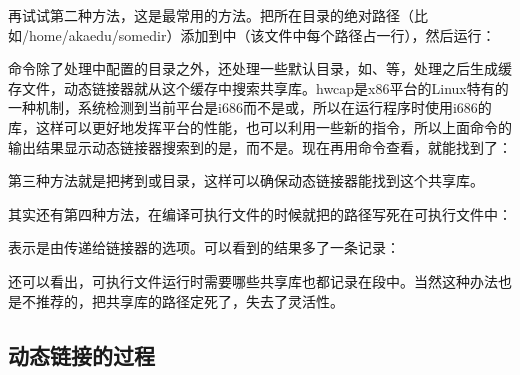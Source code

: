 再试试第二种方法，这是最常用的方法。把所在目录的绝对路径（比如/home/\BookSplit{}akaedu/\BookSplit{}somedir）添加到中（该文件中每个路径占一行），然后运行：




命令除了处理中配置的目录之外，还处理一些默认目录，如、等，处理之后生成缓存文件，动态链接器就从这个缓存中搜索共享库。hwcap是x86平台的Linux特有的一种机制，系统检测到当前平台是i686而不是或，所以在运行程序时使用i686的库，这样可以更好地发挥平台的性能，也可以利用一些新的指令，所以上面命令的输出结果显示动态链接器搜索到的是，而不是。现在再用命令查看，就能找到了：




第三种方法就是把拷到或目录，这样可以确保动态链接器能找到这个共享库。



其实还有第四种方法，在编译可执行文件的时候就把的路径写死在可执行文件中：




表示是由传递给链接器的选项。可以看到的结果多了一条记录：




还可以看出，可执行文件运行时需要哪些共享库也都记录在段中。当然这种办法也是不推荐的，把共享库的路径定死了，失去了灵活性。


\subsection{动态链接的过程}
%


